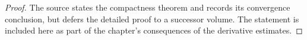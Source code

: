 \begin{proof}
\sketch The source states the compactness theorem and records its convergence conclusion, but defers the detailed proof to a successor volume. The statement is included here as part of the chapter's consequences of the derivative estimates.
\end{proof}
